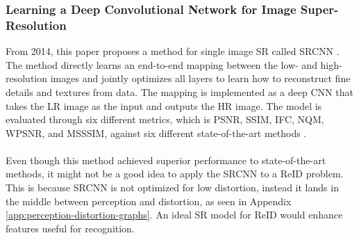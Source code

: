 \subsubsection{Learning a Deep Convolutional Network for Image Super-Resolution}

From 2014, this paper proposes a method for single image \acs{SR} called \acf{SRCNN} \cite{SRCNN}. The method directly learns an end-to-end mapping between the low- and high-resolution images and jointly optimizes all layers to learn how to reconstruct fine details and textures from data. The mapping is implemented as a deep \acs{CNN} that takes the \acs{LR} image as the input and outputs the \acs{HR} image. The model is evaluated through six different metrics, which is \acs{PSNR}, \acs{SSIM}, IFC, NQM, WPSNR, and MSSSIM, against six different state-of-the-art methods \cite{SRCNN}.  
\\\\
Even though this method achieved superior performance to state-of-the-art methods, it might not be a good idea to apply the \acs{SRCNN} to a \acs{ReID} problem. This is because \acs{SRCNN} is not optimized for low distortion, instead it lands in the middle between perception and distortion, as seen in Appendix \ref{app:perception-distortion-graphs}. An ideal \acs{SR} model for \acs{ReID} would enhance features useful for recognition. 

